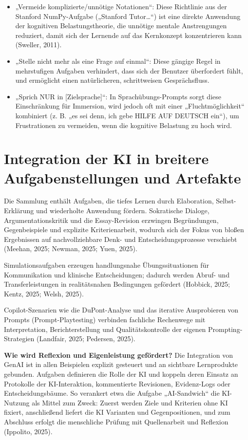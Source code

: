 \documentclass[
  ngerman,
  letterpaper,
  DIV=11]{scrreprt}
\begin{document}
\begin{itemize}
\item
  „Vermeide komplizierte/unnötige Notationen``: Diese Richtlinie aus der
  Stanford NumPy-Aufgabe („Stanford Tutor\ldots``) ist eine direkte
  Anwendung der kognitiven Belastungstheorie, die unnötige mentale
  Anstrengungen reduziert, damit sich der Lernende auf das Kernkonzept
  konzentrieren kann (Sweller, 2011).
\item
  „Stelle nicht mehr als eine Frage auf einmal``: Diese gängige Regel in
  mehrstufigen Aufgaben verhindert, dass sich der Benutzer überfordert
  fühlt, und ermöglicht einen natürlicheren, schrittweisen
  Gesprächsfluss.
\item
  „Sprich NUR in {[}Zielsprache{]}``: In Sprachübungs-Prompts sorgt
  diese Einschränkung für Immersion, wird jedoch oft mit einer
  „Fluchtmöglichkeit`` kombiniert (z. B. „es sei denn, ich gebe HILFE
  AUF DEUTSCH ein``), um Frustrationen zu vermeiden, wenn die kognitive
  Belastung zu hoch wird.
\end{itemize}

\section{Integration der KI in breitere Aufgabenstellungen und
Artefakte}\label{sec-integration-artefacts}

Die Sammlung enthält Aufgaben, die tiefes Lernen durch Elaboration,
Selbst-Erklärung und wiederholte Anwendung fördern. Sokratische Dialoge,
Argumentationskritik und die Essay-Revision erzwingen Begründungen,
Gegenbeispiele und explizite Kriterienarbeit, wodurch sich der Fokus von
bloßen Ergebnissen auf nachvollziehbare Denk- und Entscheidungsprozesse
verschiebt (Meehan, 2025; Newman, 2025; Yuen, 2025).

Simulationsaufgaben erzeugen handlungsnahe Übungssituationen für
Kommunikation und klinische Entscheidungen; dadurch werden Abruf- und
Transferleistungen in realitätsnahen Bedingungen gefördert (Hobbick,
2025; Kentz, 2025; Welsh, 2025).

Copilot-Szenarien wie die DuPont-Analyse und das iterative Ausprobieren
von Prompts (Prompt-Playtesting) verbinden fachliche Rechenwege mit
Interpretation, Berichterstellung und Qualitätskontrolle der eigenen
Prompting-Strategien (Landfair, 2025; Pedersen, 2025).

\textbf{Wie wird Reflexion und Eigenleistung gefördert?} Die Integration
von GenAI ist in allen Beispielen explizit gesteuert und an sichtbare
Lernprodukte gebunden. Aufgaben definieren die Rolle der KI und koppeln
deren Einsatz an Protokolle der KI-Interaktion, kommentierte Revisionen,
Evidenz-Logs oder Entscheidungsbäume. So verankert etwa die Aufgabe
„AI-Sandwich`` die KI-Nutzung als Mittel zum Zweck: Zuerst werden Ziele
und Kriterien ohne KI fixiert, anschließend liefert die KI Varianten und
Gegenpositionen, und zum Abschluss erfolgt die menschliche Prüfung mit
Quellenarbeit und Reflexion (Ippolito, 2025).
\end{document}
